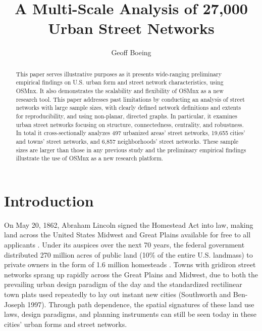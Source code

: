 \documentclass[Afour,sageh,times]{sage/sagej}
\begin{document}
\title{A Multi-Scale Analysis of 27,000 Urban Street Networks}
\author{Geoff Boeing}

\begin{abstract}
This paper serves illustrative purposes as it presents wide-ranging preliminary empirical findings on U.S. urban form and street network characteristics, using OSMnx. It also demonstrates the scalability and flexibility of OSMnx as a new research tool. This paper addresses past limitations by conducting an analysis of street networks with large sample sizes, with clearly defined network definitions and extents for reproducibility, and using non-planar, directed graphs. In particular, it examines urban street networks focusing on structure, connectedness, centrality, and robustness. In total it cross-sectionally analyzes 497 urbanized areas' street networks, 19,655 cities' and towns' street networks, and 6,857 neighborhoods' street networks. These sample sizes are larger than those in any previous study and the preliminary empirical findings illustrate the use of OSMnx as a new research platform.
\end{abstract}


\maketitle

\section{Introduction}
On May 20, 1862, Abraham Lincoln signed the Homestead Act into law, making land across the United States Midwest and Great Plains available for free to all applicants \cite{porterfield_homestead_2005}. Under its auspices over the next 70 years, the federal government distributed 270 million acres of public land (10\% of the entire U.S. landmass) to private owners in the form of 1.6 million homesteads \cite{lee_kansas_1979, sherraden_inclusion_2005}. Towns with gridiron street networks sprang up rapidly across the Great Plains and Midwest, due to both the prevailing urban design paradigm of the day and the standardized rectilinear town plats used repeatedly to lay out instant new cities (Southworth and Ben-Joseph 1997). Through path dependence, the spatial signatures of these land use laws, design paradigms, and planning instruments can still be seen today in these cities' urban forms and street networks.
\end{document}
